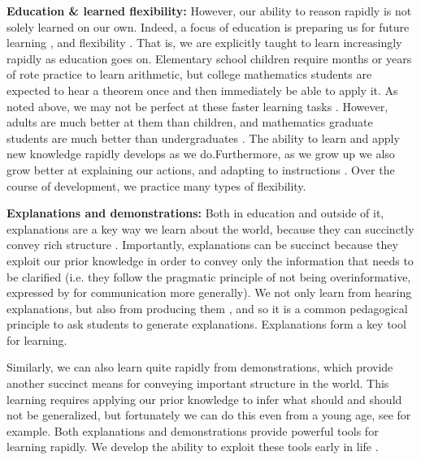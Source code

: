 \textbf{Education \& learned flexibility:} However, our ability to reason rapidly is not solely learned on our own. Indeed, a focus of education is preparing us for future learning \citep{Bransford1999}, and flexibility \citep[e.g.][]{Richland2012}. That is, we are explicitly taught to learn increasingly rapidly as education goes on. Elementary school children require months or years of rote practice to learn arithmetic, but college mathematics students are expected to hear a theorem once and then immediately be able to apply it. As noted above, we may not be perfect at these faster learning tasks \citep[e.g.][]{Hazzan1999}. However, adults are much better at them than children, and mathematics graduate students are much better than undergraduates \citep{Weber2001}. The ability to learn and apply new knowledge rapidly develops as we do.Furthermore, as we grow up we also grow better at explaining our actions, and adapting to instructions \citep[e.g.][]{Doebel2015}. Over the course of development, we practice many types of flexibility. \par 
\textbf{Explanations and demonstrations:} Both in education and outside of it, explanations are a key way we learn about the world, because they can succinctly convey rich structure \citep[e.g.][]{Keil2006, Lombrozo2006}. Importantly, explanations can be succinct because they exploit our prior knowledge in order to convey only the information that needs to be clarified (i.e. they follow the pragmatic principle of not being overinformative, expressed by \citet{Grice1975} for communication more generally). We not only learn from hearing explanations, but also from producing them \citep{Chi1989, Chi1994}, and so it is a common pedagogical principle to ask students to generate explanations. Explanations form a key tool for learning. \par
Similarly, we can also learn quite rapidly from demonstrations, which provide another succinct means for conveying important structure in the world. This learning requires applying our prior knowledge to infer what should and should not be generalized, but fortunately we can do this even from a young age, see \citet{VanDamme2002} for example. Both explanations and demonstrations provide powerful tools for learning rapidly. We develop the ability to exploit these tools early in life \citep{Carpenter2005}. \par 
